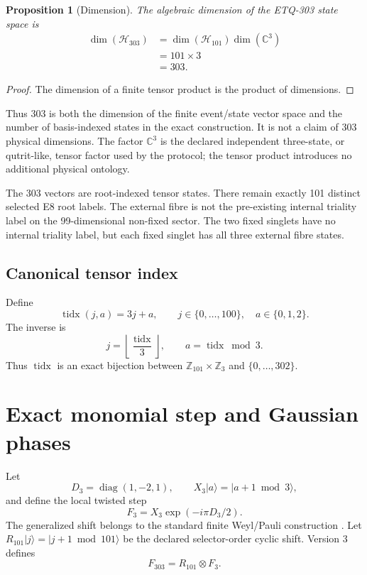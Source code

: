 \documentclass[11pt,a4paper]{article}
\newtheorem{proposition}[theorem]{Proposition}
\theoremstyle{definition}
\newcommand{\Hone}{\mathcal H_{101}}
\newcommand{\Hthree}{\mathcal H_{303}}
\newcommand{\Fthree}{F_{303}}
\newcommand{\Zthree}{\mathbb Z_{3}}
\newcommand{\Zone}{\mathbb Z_{101}}
\begin{document}
\begin{proposition}[Dimension]
The algebraic dimension of the ETQ-303 state space is
\begin{align}
\dim(\Hthree)
&=\dim(\Hone)\dim(\mathbb C^3)\\
&=101\times3\\
&=303.
\end{align}
\end{proposition}
\begin{proof}
The dimension of a finite tensor product is the product of dimensions.
\end{proof}

Thus 303 is both the dimension of the finite event/state vector space and the number of basis-indexed states in the exact construction. It is not a claim of 303 physical dimensions. The factor $\mathbb C^3$ is the declared independent three-state, or qutrit-like, tensor factor used by the protocol; the tensor product introduces no additional physical ontology.

The 303 vectors are root-indexed tensor states. There remain exactly 101 distinct selected E8 root labels. The external fibre is not the pre-existing internal triality label on the 99-dimensional non-fixed sector. The two fixed singlets have no internal triality label, but each fixed singlet has all three external fibre states.

\subsection{Canonical tensor index}
Define
\begin{equation}
\operatorname{tidx}(j,a)=3j+a,
\qquad
j\in\{0,\ldots,100\},\quad a\in\{0,1,2\}.
\end{equation}
The inverse is
\begin{equation}
j=\left\lfloor\frac{\operatorname{tidx}}3\right\rfloor,
\qquad
a=\operatorname{tidx}\bmod3.
\end{equation}
Thus $\operatorname{tidx}$ is an exact bijection between $\Zone\times\Zthree$ and $\{0,\ldots,302\}$.

\section{Exact monomial step and Gaussian phases}
Let
\begin{equation}
D_3=\operatorname{diag}(1,-2,1),
\qquad
X_3|a\rangle=|a+1\bmod3\rangle,
\end{equation}
and define the local twisted step
\begin{equation}
F_3=X_3\exp(-i\pi D_3/2).
\end{equation}
The generalized shift belongs to the standard finite Weyl/Pauli construction \cite{schwinger1960unitary}. Let $R_{101}|j\rangle=|j+1\bmod101\rangle$ be the declared selector-order cyclic shift. Version 3 defines
\begin{equation}
\boxed{\Fthree=R_{101}\otimes F_3.}
\end{equation}
\end{document}
